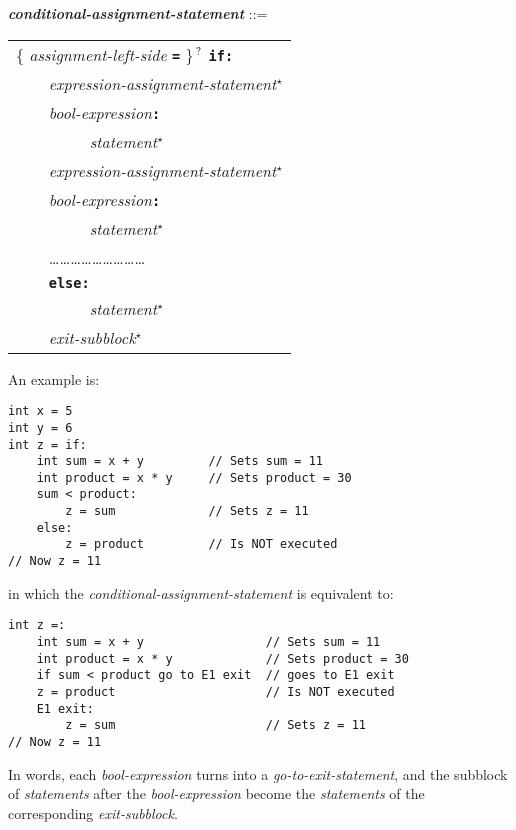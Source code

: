 \documentclass[12pt]{article}
\newcommand{\TT}[1]{{\tt \bfseries #1}}
\newcommand{\STAR}{{\Large $^\star$}}
\newcommand{\QMARK}{{$^{\,\mbox{\footnotesize ?}}$}}
\newcommand{\ttkey}[1]{{\tt \bfseries #1}}
\newcommand{\emkey}[1]{{\em \bfseries #1}}
\newenvironment{indpar}[1][0.3in]%
	{\begin{list}{}%
		     {\setlength{\itemsep}{0in}%
		      \setlength{\topsep}{0in}%
		      \setlength{\parsep}{1ex}%
		      \setlength{\labelwidth}{#1}%
		      \setlength{\leftmargin}{#1}%
		      \addtolength{\leftmargin}{\labelsep}}%
	 \item}%
	{\end{list}}
\begin{document}
\begin{indpar}
\emkey{conditional-assignment-statement} ::= \\
\hspace*{0.5in}\begin{tabular}[t]{l}
        \{ {\em assignment-left-side} \TT{=} \}\QMARK{} \ttkey{if}\TT{:} \\
	\TT{~~~~}{\em expression-assignment-statement}\STAR{} \\
	\TT{~~~~}{\em bool-expression}\TT{:} \\
	\TT{~~~~~~~~~}{\em statement}\STAR{} \\
	\TT{~~~~}{\em expression-assignment-statement}\STAR{} \\
	\TT{~~~~}{\em bool-expression}\TT{:} \\
	\TT{~~~~~~~~~}{\em statement}\STAR{} \\
	\TT{~~~~}\ldots\ldots\ldots\ldots\ldots\ldots\ldots\ldots\ldots \\
	\TT{~~~~}\ttkey{else}\TT{:} \\
	\TT{~~~~~~~~~}{\em statement}\STAR{} \\
	\TT{~~~~}{\em exit-subblock}\STAR{}
	\end{tabular}
\end{indpar}

An example is:
\begin{indpar}\begin{verbatim}
int x = 5
int y = 6
int z = if:
    int sum = x + y         // Sets sum = 11
    int product = x * y     // Sets product = 30
    sum < product:
        z = sum             // Sets z = 11
    else:
        z = product         // Is NOT executed
// Now z = 11
\end{verbatim}\end{indpar}
in which the {\em conditional-assignment-statement} is equivalent to:
\begin{indpar}\begin{verbatim}
int z =:
    int sum = x + y                 // Sets sum = 11
    int product = x * y             // Sets product = 30
    if sum < product go to E1 exit  // goes to E1 exit
    z = product                     // Is NOT executed
    E1 exit:
        z = sum                     // Sets z = 11
// Now z = 11
\end{verbatim}\end{indpar}

In words, each {\em bool-expression} turns into a
{\em go-to-exit-statement}, and the subblock of {\em statements}
after the {\em bool-expression} become the {\em statements}
of the corresponding {\em exit-subblock}.
\end{document}
